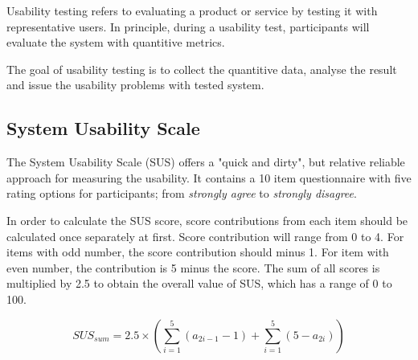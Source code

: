 Usability testing refers to evaluating a product or service by testing it with representative users. In principle, during a usability test, participants  will evaluate the system with quantitive metrics. 

The goal of usability testing is to collect the quantitive data, analyse the result and issue the usability problems with tested system. 

\subsection{System Usability Scale}

The System Usability Scale (SUS) offers a "quick and dirty", but relative reliable approach for measuring the usability\cite{brooke1996sus}.  It contains a 10 item questionnaire with five rating options for participants; from \textit{strongly agree} to \textit{strongly disagree}.


In order to calculate the SUS score, score contributions from each item should be calculated once separately at first. Score contribution will range from 0 to 4. For items with odd number, the score contribution should minus 1. For item with even number, the contribution is 5 minus the score. The sum of all scores is multiplied by 2.5 to obtain the overall value of SUS, which has a range of 0 to 100.

\begin{equation}
\label{formular:SUS}
SUS_{sum} = 2.5 \times \left (  \sum_{ i=1}^{5} \left ( a_{2i-1} - 1 \right ) + \sum_{ i=1}^{5} \left ( 5 - a_{2i} \right ) \right ) 
\end{equation}


